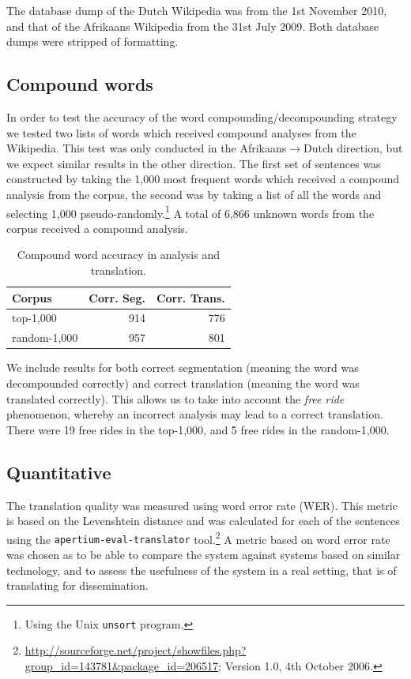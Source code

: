 \documentclass[11pt]{article}
\begin{document}
The database dump of the Dutch Wikipedia was from the 1st November 2010, and that
of the Afrikaans Wikipedia from the 31st July 2009. Both database dumps were 
stripped of formatting.

\subsection{Compound words}

In order to test the accuracy of the word compounding/decompounding strategy
we tested two lists of words which received compound analyses from 
the Wikipedia. This test was only conducted in the Afrikaans$\rightarrow$Dutch
direction, but we expect similar results in the other direction. The first
set of sentences was constructed by taking the 1,000 most frequent words which received 
a compound analysis from the corpus, the second was by taking a list of all the words and selecting
1,000 pseudo-randomly.\footnote{Using the Unix {\small {\tt unsort}} program.} A total of
6,866 unknown words from the corpus received a compound analysis.

\begin{table}
  \begin{center}
  \begin{tabular}{|l|r|r|}
   \hline
   {\bf Corpus}    & {\bf Corr. Seg.}    & {\bf Corr. Trans.}\\
   \hline
   top-1,000       & 914                 &  776 \\ 
   \hline
   random-1,000    & 957                 &  801 \\ 
   \hline
  \end{tabular}
    \caption{Compound word accuracy in analysis and translation.}
    \label{table:compounds}
  \end{center}
\end{table}

We include results for both correct segmentation (meaning the word was decompounded 
correctly) and correct translation (meaning the word was translated correctly). This allows
us to take into account the {\em free ride} phenomenon, whereby an incorrect analysis
may lead to a correct translation. There were 19 free rides in the top-1,000, and 5 free 
rides in the random-1,000.

\subsection{Quantitative}

The translation quality was measured using word error rate (WER).
This metric is based on the Levenshtein distance \cite{Levenshtein:65} and was calculated for each of the sentences using the 
{\small \texttt{apertium-eval-translator}} tool.\footnote{\url{http://sourceforge.net/project/showfiles.php?group_id=143781&package_id=206517}; Version 1.0, 4th October 2006.} A metric based on word error rate was chosen as to be able to compare 
the system against systems based on similar technology, and to assess the usefulness of the 
system in a real setting, that is of translating for dissemination. 
\end{document}
